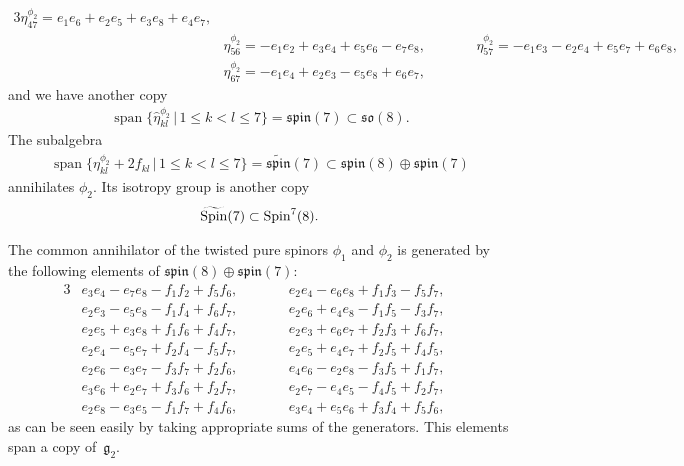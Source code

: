 \documentclass[10pt,a4paper]{amsart}
\numberwithin{equation}{section}
\begin{document}
{\begin{alignat*}{3}
 \eta^{\phi_2}_{4 7} = e_{1} e_{6} + e_{2} e_{5} + e_{3} e_{8} + e_{4} e_{7},&\\
& \eta^{\phi_2}_{5 6} = -e_{1} e_{2} + e_{3} e_{4} + e_{5} e_{6} - e_{7} e_{8},\qquad &&
 \eta^{\phi_2}_{5 7} = -e_{1} e_{3} - e_{2} e_{4} + e_{5} e_{7} + e_{6} e_{8},&\\
& \eta^{\phi_2}_{6 7} = -e_{1} e_{4} + e_{2} e_{3} - e_{5} e_{8} + e_{6} e_{7},\qquad &&&
\end{alignat*}
and we have another copy
\begin{gather*}\operatorname{span}\big\{\hat\eta_{kl}^{\phi_2} \,|\, 1\leq k<l\leq 7 \big\} = \mathfrak{spin}(7) \subset \mathfrak{so}(8).\end{gather*}
The subalgebra
\begin{gather*}\operatorname{span}\big\{\eta_{kl}^{\phi_2} + 2 f_{kl}\,|\, 1\leq k<l\leq 7 \big\} = \widetilde{\mathfrak{spin}}(7) \subset
\mathfrak{spin}(8)\oplus \mathfrak{spin}(7)\end{gather*}
annihilates ${\phi_2}$. Its isotropy group is another copy
\begin{gather*}\widetilde{\rm Spin}(7)\subset {\rm Spin}^7(8).\end{gather*}

}

The common annihilator of the twisted pure spinors $\phi_1$ and $\phi_2$ is generated by the following elements of $\mathfrak{spin}(8)\oplus \mathfrak{spin}(7)$:
\begin{alignat*}{3}
& e_3 e_4 - e_7 e_8 - f_1 f_2 + f_5 f_6,\qquad && e_2 e_4 - e_6 e_8 + f_1 f_3 - f_5 f_7,&\\
& e_2 e_3 - e_5 e_8 - f_1 f_4 + f_6 f_7,\qquad && e_2 e_6 + e_4 e_8 - f_1 f_5 - f_3 f_7,&\\
& e_2 e_5 + e_3 e_8 + f_1 f_6 + f_4 f_7,\qquad && e_2 e_3 + e_6 e_7 + f_2 f_3 + f_6 f_7,& \\
& e_2 e_4 - e_5 e_7 + f_2 f_4 - f_5 f_7,\qquad && e_2 e_5 + e_4 e_7 + f_2 f_5 + f_4 f_5,& \\
& e_2 e_6 - e_3 e_7 - f_3 f_7 + f_2 f_6,\qquad && e_4 e_6 - e_2 e_8 - f_3 f_5 + f_1 f_7,& \\
& e_3 e_6 + e_2 e_7 + f_3 f_6 + f_2 f_7,\qquad && e_2 e_7 - e_4 e_5 - f_4 f_5 + f_2 f_7,& \\
&e_2 e_8 - e_3 e_5 - f_1 f_7 + f_4 f_6,\qquad && e_3 e_4 + e_5 e_6 + f_3 f_4 + f_5 f_6,&
\end{alignat*}
as can be seen easily by taking appropriate sums of the generators. This elements span a copy of~$\mathfrak{g}_2$.
\end{document}
